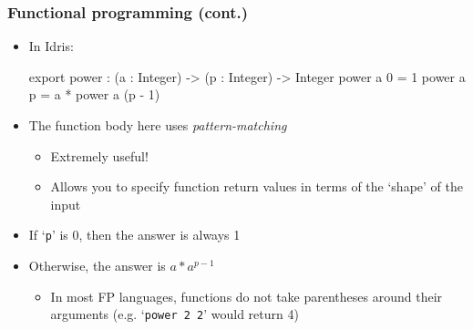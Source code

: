 \documentclass{beamer}
\begin{document}
  \begin{frame}[fragile]
    \frametitle{Functional programming (cont.)}

    \begin{itemize}
      \item In Idris:
      \vspace*{-5mm}
      {\footnotesize
        \begin{idrislisting}
export
power : (a : Integer) -> (p : Integer) -> Integer
power a 0 = 1
power a p = a * power a (p - 1)
      \end{idrislisting}}
      \vspace*{-1mm}
      \item The function body here uses \textit{pattern-matching}
        \begin{itemize}
          \item Extremely useful!
          \item Allows you to specify function return values in terms of the
                `shape' of the input
        \end{itemize}
      \item If `\texttt{p}' is 0, then the answer is always 1
      \item Otherwise, the answer is $a * a^{p-1}$
        \begin{itemize}
          \item In most FP languages, functions do not take parentheses around
                their arguments (e.g. `\texttt{power 2 2}' would return 4)
        \end{itemize}
    \end{itemize}

  \end{frame}
\end{document}
